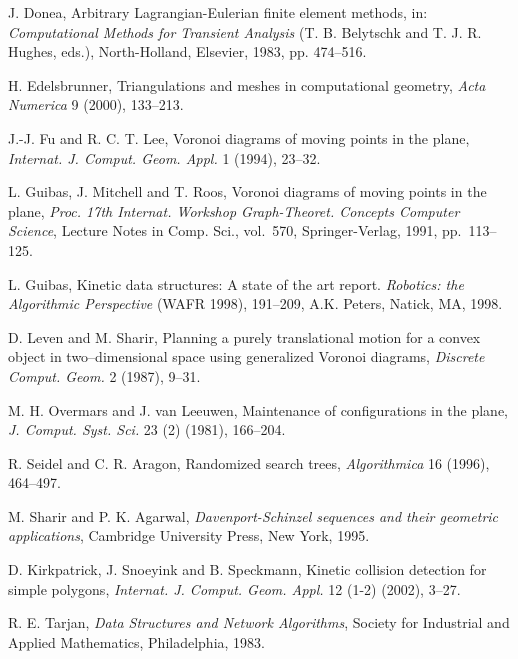 \documentclass[11pt]{article}
\begin{document}
\begin{thebibliography}{}
J. Donea, Arbitrary Lagrangian-Eulerian finite element methods, in: \textit{Computational Methods for Transient
Analysis} (T. B. Belytschk and T. J. R. Hughes, eds.), North-Holland, Elsevier, 1983, pp. 474--516.

H. Edelsbrunner, Triangulations and meshes in computational geometry, \textit{Acta Numerica} 9 (2000), 133--213.


J.-J. Fu and R. C. T. Lee, Voronoi diagrams of moving points in the
plane, {\it Internat. J. Comput. Geom. Appl.} 1 (1994), 23--32.

L. Guibas, J. Mitchell and T. Roos, Voronoi diagrams of moving
points in the plane, {\it Proc. 17th Internat. Workshop
Graph-Theoret. Concepts Computer Science}, Lecture Notes in Comp.
Sci., vol.\ 570, Springer-Verlag, 1991, pp.\ 113--125.

L. Guibas,
Kinetic data structures: A state of the art report.
{\it Robotics: the Algorithmic Perspective} (WAFR 1998),
191--209, A.K. Peters, Natick, MA, 1998.



D. Leven and M. Sharir,
Planning a purely translational motion for a convex object in
two--dimensional space using generalized Voronoi diagrams,
{\it Discrete Comput. Geom.} 2 (1987), 9--31.




M. H. Overmars and J. van Leeuwen, 
Maintenance of configurations in the plane, {\it J. Comput. Syst. Sci.} 23 (2) (1981), 166--204.

R. Seidel and C. R. Aragon,
Randomized search trees,
{\it Algorithmica} 16 (1996), 464--497.

M. Sharir and P. K. Agarwal,
{\it Davenport-Schinzel sequences and their geometric applications},
Cambridge University Press, New York, 1995.

 D. Kirkpatrick, J. Snoeyink and B. Speckmann, Kinetic collision detection for simple polygons, 
{\it Internat. J. Comput. Geom. Appl.} 12 (1-2) (2002), 3--27.

 R. E. Tarjan, \textit{Data Structures and Network Algorithms}, Society for Industrial and Applied Mathematics, Philadelphia, 1983.

\end{thebibliography}
\end{document}
